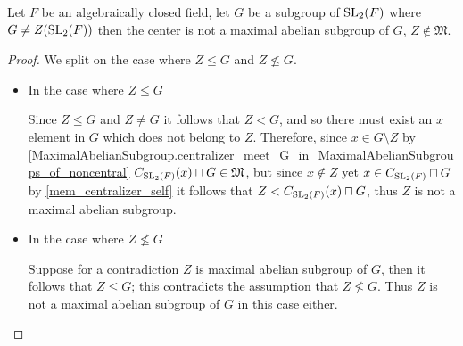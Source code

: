 \begin{lemma}
  \label{MaximalAbelianSubgroup.center_not_mem}
  \leanok
  Let $F$ be an algebraically closed field, let $G$ be a subgroup of $\operatorname{SL}_2(F)$ where $G \ne Z(\operatorname{SL}_2(F))$ then the 
  center is not a maximal abelian subgroup of $G$, $Z \notin \mathfrak{M}$.
\end{lemma}
\begin{proof}
 \leanok
  We split on the case where $Z \le G$ and $Z \not\le G$.
  \begin{itemize}
    \item In the case where $Z \le G$
    
    Since $Z \le G$ and $Z \ne G$ it follows that $Z < G$, and so there must exist an $x$ element in $G$ which does not
    belong to $Z$. Therefore, since $x \in G \setminus Z$ by \ref{MaximalAbelianSubgroup.centralizer_meet_G_in_MaximalAbelianSubgroups_of_noncentral}
    $C_{\operatorname{SL}_2(F)}(x) \sqcap G \in \mathfrak{M}$, but since $x \notin Z$ yet $x \in C_{\operatorname{SL}_2(F)} \sqcap G$ by \ref{mem_centralizer_self} 
    it follows that $Z < C_{\operatorname{SL}_2(F)}(x) \sqcap G$, thus $Z$ is not a maximal abelian subgroup.
    
    \item In the case where $Z \not\le G$
    
    Suppose for a contradiction $Z$ is maximal abelian subgroup of $G$, then it follows that 
    $Z \le G$; this contradicts the assumption that $Z \not\le G$. Thus $Z$ is not a maximal abelian subgroup of $G$ in this case either.
  \end{itemize}
\end{proof}
